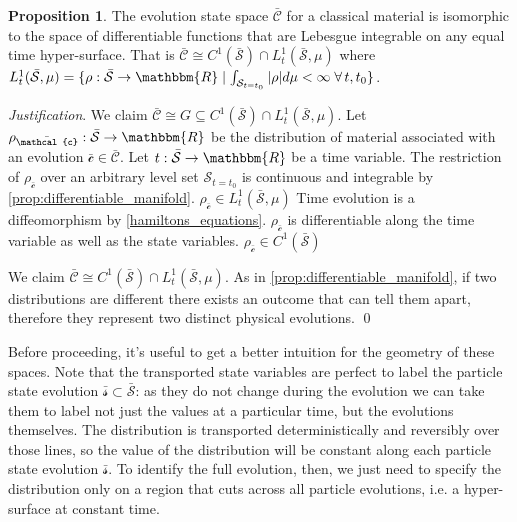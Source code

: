 \documentclass[aps,pra,10pt,twocolumn,floatfix,nofootinbib]{revtex4-1}
\numberwithin{equation}{section}
\theoremstyle{definition}
\newtheorem{prop}[equation]{Proposition}
\newenvironment{justification}{\emph{Justification}.}{\qed}
\begin{document}
\begin{prop}\label{material_evolution_state_space}
	The evolution state space $\bar{\mathcal{C}}$ for a classical material is isomorphic to the space of differentiable functions that are Lebesgue integrable on any equal time hyper-surface. That is $\bar{\mathcal{C}} \cong  C^1(\bar{\mathcal{S}})\cap L^1_t(\bar{\mathcal{S}}, \mu)$ where $L^1_t(\bar{\mathcal{S}}, \mu)=\{{\rho: \bar{\mathcal{S}} \rightarrow \mathbbm{R}} \; | \; {\int_{\mathcal{S}_{t=t_0}} |\rho| d\mu < \infty} \; \forall \, t, t_0 \}$.
\end{prop}

\begin{justification}
	We claim $\bar{\mathcal{C}} \cong  G \subseteq C^1(\bar{\mathcal{S}})\cap L^1_t(\bar{\mathcal{S}}, \mu)$. Let $\rho_{\bar{\mathcal{c}}} : \bar{\mathcal{S}} \rightarrow \mathbbm{R}$ be the distribution of material associated with an evolution $\bar{\mathcal{c}} \in \bar{\mathcal{C}}$. Let $t : \bar{\mathcal{S}} \rightarrow \mathbbm{R}$ be a time variable. 
	The restriction of $\rho_{\bar{\mathcal{c}}}$ over an arbitrary level set $\mathcal{S}_{t=t_0}$ is continuous and integrable by \ref{prop:differentiable_manifold}. $\rho_{\bar{\mathcal{c}}} \in L^1_t(\bar{\mathcal{S}}, \mu)$ Time evolution is a diffeomorphism by \ref{hamiltons_equations}. $\rho_{\bar{\mathcal{c}}}$ is differentiable along the time variable as well as the state variables. $\rho_{\bar{\mathcal{c}}} \in C^1(\bar{\mathcal{S}})$
	
	We claim $\bar{\mathcal{C}} \cong  C^1(\bar{\mathcal{S}})\cap L^1_t(\bar{\mathcal{S}}, \mu)$. As in \ref{prop:differentiable_manifold}, if two distributions are different there exists an outcome that can tell them apart, therefore they represent two distinct physical evolutions.
\end{justification}

Before proceeding, it's useful to get a better intuition for the geometry of these spaces. Note that the transported state variables are perfect to label the particle state evolution $\bar{\mathcal{s}} \subset \bar{\mathcal{S}}$: as they do not change during the evolution we can take them to label not just the values at a particular time, but the evolutions themselves. The distribution is transported deterministically and reversibly over those lines, so the value of the distribution will be constant along each particle state evolution $\bar{\mathcal{s}}$. To identify the full evolution, then, we just need to specify the distribution only on a region that cuts across all particle evolutions, i.e. a hyper-surface at constant time.
\end{document}
